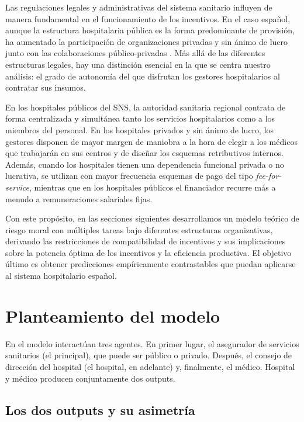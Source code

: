 Las regulaciones legales y administrativas del sistema sanitario influyen de manera fundamental en el funcionamiento de los incentivos. En el caso español, aunque la estructura hospitalaria pública es la forma predominante de provisión, ha aumentado la participación de organizaciones privadas y sin ánimo de lucro junto con las colaboraciones público-privadas \citep{repullo2008}. Más allá de las diferentes estructuras legales, hay una distinción esencial en la que se centra nuestro análisis: el grado de autonomía del que disfrutan los gestores hospitalarios al contratar sus insumos.

En los hospitales públicos del SNS, la autoridad sanitaria regional contrata de forma centralizada y simultánea tanto los servicios hospitalarios como a los miembros del personal. En los hospitales privados y sin ánimo de lucro, los gestores disponen de mayor margen de maniobra a la hora de elegir a los médicos que trabajarán en sus centros y de diseñar los esquemas retributivos internos. Además, cuando los hospitales tienen una dependencia funcional privada o no lucrativa, se utilizan con mayor frecuencia esquemas de pago del tipo \textit{fee-for-service}, mientras que en los hospitales públicos el financiador recurre más a menudo a remuneraciones salariales fijas.

Con este propósito, en las secciones siguientes desarrollamos un modelo teórico de riesgo moral con múltiples tareas bajo diferentes estructuras organizativas, derivando las restricciones de compatibilidad de incentivos y sus implicaciones sobre la potencia óptima de los incentivos y la eficiencia productiva. El objetivo último es obtener predicciones empíricamente contrastables que puedan aplicarse al sistema hospitalario español.


\section{Planteamiento del modelo}
\label{sec:planteamiento}

En el modelo interactúan tres agentes. En primer lugar, el asegurador de servicios sanitarios (el principal), que puede ser público o privado. Después, el consejo de dirección del hospital (el hospital, en adelante) y, finalmente, el médico. Hospital y médico producen conjuntamente dos outputs.

\subsection{Los dos outputs y su asimetría}

